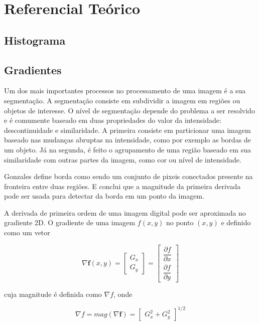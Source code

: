 \chapter{Referencial Teórico}

\section{Histograma}

\section{Gradientes}

Um dos mais importantes processos no processamento de uma imagem é a sua segmentação. A segmentação consiste em subdividir a imagem em regiões ou objetos de interesse. O nível de segmentação depende do problema a ser resolvido e é comumente baseado em duas propriedades do valor da intensidade: descontinuidade e similaridade. A primeira consiste em particionar uma imagem baseado nas mudanças abruptas na intensidade, como por exemplo as bordas de um objeto. Já na segunda, é feito o agrupamento de uma região baseado em sua similaridade com outras partes da imagem, como cor ou nível de intensidade.

Gonzales define borda como sendo um conjunto de pixeis conectados  presente na fronteira entre duas regiões. E conclui que a magnitude da primeira derivada pode ser usada para detectar da borda em um ponto da imagem.

A derivada de primeira ordem de uma imagem digital pode ser aproximada no gradiente 2D. O gradiente de uma imagem \(f(x,y)\) no ponto \((x,y)\) e definido como um vetor

\begin{equation}
\nabla \mathbf{f}(x,y) = 
\begin{bmatrix}
G_x \\ G_y
\end{bmatrix} =
\begin{bmatrix}
\dfrac{ \partial f}{\partial x} 
\\[2ex]
\dfrac{ \partial f}{\partial y}
\end{bmatrix}
\end{equation}

cuja magnitude é definida como \(\nabla f\), onde

\begin{equation}
\nabla f = mag(\nabla \mathbf{f}) = 
\begin{bmatrix}
G_x^2 + G_y^2
\end{bmatrix}^{1/2}
\end{equation}

